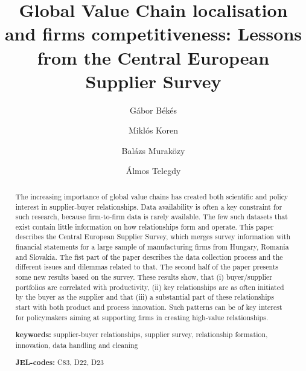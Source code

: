 \documentclass[final, dvipsnames, authoryear,12pt]{elsarticle}
\begin{document}
\begin{frontmatter}
\title{Global Value Chain localisation and firms competitiveness: Lessons from the Central European Supplier Survey}






\author[gb]{G\'{a}bor B\'{e}k\'{e}s}
\author[mk]{Miklós Koren}
\author[bm]{Balázs Muraközy}
\author[at]{Álmos Telegdy}
 \address[gb]{Central European University, Institute of Economics and CEPR}
 \address[mk]{Central European University, Institute of Economics and CEPR}
 \address[bm]{University of Liverpool, Institute of Economics }
 \address[at]{National Bank of Hungary}
 
 




\begin{abstract}
    The increasing importance of global value chains has created both scientific and policy interest in supplier-buyer relationships. Data availability is often a key constraint for such research, because firm-to-firm data is rarely available. The few such datasets that exist contain little information on how relationships form and operate. This paper describes the Central European Supplier Survey, which merges survey information with financial statements for a large sample of manufacturing firms from Hungary, Romania and Slovakia. The fist part of the paper describes the data collection process and the different issues and dilemmas related to that. The second half of the paper presents some new results based on the survey. These results show, that (i) buyer/supplier portfolios are correlated with productivity, (ii) key relationships are as often initiated by the buyer as the supplier and that (iii) a substantial part of these relationships start with both product and process innovation. Such patterns can be of key interest for policymakers aiming at supporting firms in creating high-value relationships.
    
       \vspace{2mm} 
   
   \textbf{keywords:} supplier-buyer relationships, supplier survey, relationship formation, innovation, data handling and cleaning 
   
    \vspace{2mm}
    
   \textbf{JEL-codes:} C83, D22, D23 
\end{abstract}


\end{frontmatter}
\end{document}
